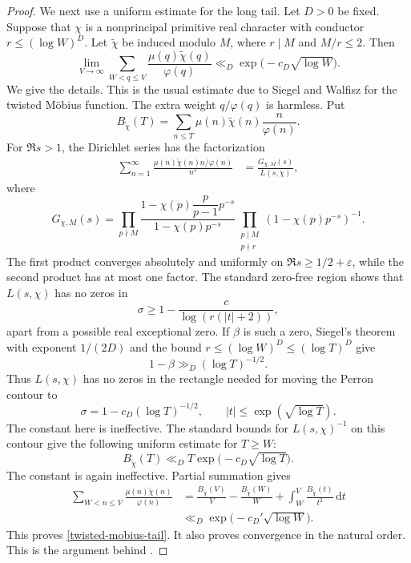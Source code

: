 \documentclass[12pt,reqno]{amsart}
\numberwithin{equation}{section}
\theoremstyle{plain}
\theoremstyle{remark}
\newcommand{\dif}{\mathrm{d}}
\begin{document}
\begin{proof}
We next use a uniform estimate for the long tail.  Let $D>0$ be fixed.
Suppose that $\chi$ is a nonprincipal primitive real character with
conductor $r\leq(\log W)^D$.  Let $\widetilde\chi$ be induced modulo
$M$, where $r\mid M$ and $M/r\leq2$.  Then
\begin{equation}\label{twisted-mobius-tail}
 \lim_{V\to\infty}\sum_{W<q\leq V}
 \frac{\mu(q)\widetilde\chi(q)}{\varphi(q)}
 \ll_D \exp\bigl(-c_D\sqrt{\log W}\bigr).
\end{equation}
We give the details.  This is the usual estimate due to Siegel and Walfisz
for the twisted M\"obius function.  The extra weight $q/\varphi(q)$ is
harmless.  Put
\[
 B_{\widetilde\chi}(T)=
 \sum_{n\leq T}\mu(n)\widetilde\chi(n)\frac n{\varphi(n)}.
\]
For $\Re s>1$, the Dirichlet series has the factorization
\begin{align*}
 \sum_{n=1}^{\infty}
 \frac{\mu(n)\widetilde\chi(n)n/\varphi(n)}{n^s}
 &=\frac{G_{\chi,M}(s)}{L(s,\chi)},          \label{mobius-factorization}
\end{align*}
where
\[
 G_{\chi,M}(s)=
 \prod_{p\nmid M}
 \frac{1-\chi(p)\dfrac p{p-1}p^{-s}}
      {1-\chi(p)p^{-s}}
 \prod_{\substack{p\mid M\\p\nmid r}}
 (1-\chi(p)p^{-s})^{-1}.
\]
The first product converges absolutely and uniformly on
$\Re s\geq1/2+\varepsilon$, while the second product has at most one
factor.  The standard zero-free region shows that $L(s,\chi)$ has no zeros in
\[
 \sigma\geq1-\frac{c}{\log(r(|t|+2))},
\]
apart from a possible real exceptional zero. If $\beta$ is such a
zero, Siegel's theorem with exponent $1/(2D)$ and the bound
$r\leq(\log W)^D\leq(\log T)^D$ give
\[
 1-\beta\gg_D(\log T)^{-1/2}.
\]
Thus $L(s,\chi)$ has no zeros in the rectangle needed for moving the
Perron contour to
\[
 \sigma=1-c_D(\log T)^{-1/2},
 \qquad |t|\leq\exp(\sqrt{\log T}).
\]
The constant here is ineffective.  The standard bounds for
$L(s,\chi)^{-1}$ on this contour give the following uniform estimate
for $T\geq W$:
\begin{equation*}\label{weighted-mobius-partial-sum}
 B_{\widetilde\chi}(T)
 \ll_D T\exp\bigl(-c_D\sqrt{\log T}\bigr).
\end{equation*}
The constant is again ineffective.  Partial summation gives
\begin{align*}
 \sum_{W<n\leq V}
 \frac{\mu(n)\widetilde\chi(n)}{\varphi(n)}
 &=\frac{B_{\widetilde\chi}(V)}V
   -\frac{B_{\widetilde\chi}(W)}W
   +\int_W^V\frac{B_{\widetilde\chi}(t)}{t^2}\,\dif t\\
 &\ll_D\exp\bigl(-c_D'\sqrt{\log W}\bigr).
\end{align*}
This proves \eqref{twisted-mobius-tail}.  It also proves convergence in
the natural order.  This is the argument behind
\cite[(5.7)]{BaierZhao2007}.


\end{proof}
\end{document}
